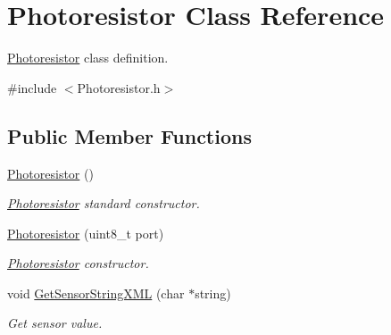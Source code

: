 \hypertarget{classPhotoresistor}{}\section{Photoresistor Class Reference}
\label{classPhotoresistor}


\hyperlink{classPhotoresistor}{Photoresistor} class definition.  




{\ttfamily \#include $<$Photoresistor.\+h$>$}

\subsection*{Public Member Functions}
\begin{DoxyCompactItemize}
\item 
\hyperlink{classPhotoresistor_a2a717a2af0b5000b3971dc9e57a16e8e}{Photoresistor} ()
\begin{DoxyCompactList}\small\item\em \hyperlink{classPhotoresistor}{Photoresistor} standard constructor. \end{DoxyCompactList}\item 
\hyperlink{classPhotoresistor_acfcec6e681f44e5c25ea876583f26964}{Photoresistor} (uint8\+\_\+t port)
\begin{DoxyCompactList}\small\item\em \hyperlink{classPhotoresistor}{Photoresistor} constructor. \end{DoxyCompactList}\item 
void \hyperlink{classPhotoresistor_afa6d3901116b270855a95156f99010e4}{Get\+Sensor\+String\+X\+ML} (char $\ast$string)
\begin{DoxyCompactList}\small\item\em Get sensor value. \end{DoxyCompactList}\end{DoxyCompactItemize}
